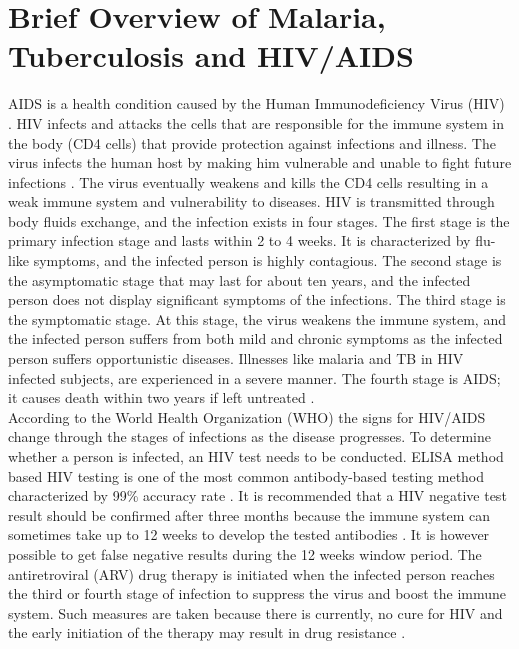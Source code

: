 


\section{Brief Overview of Malaria, Tuberculosis and HIV/AIDS}
AIDS is a health condition caused by the Human Immunodeficiency Virus (HIV) \cite{mbulaiteye_hiv_2011,dalessandro_comparison_1995}. HIV infects and attacks the cells that are responsible for the immune system in the body (CD4 cells) that provide protection against infections and illness. The virus infects the human host by making him vulnerable and unable to fight future infections \cite{joint_united_nations_programme_on_hiv/aids_aids_2007}. The virus eventually weakens and kills the CD4 cells resulting in a weak immune system and vulnerability to diseases. HIV is transmitted through body fluids exchange, and the infection exists in four stages. The first stage is the primary infection stage and lasts within 2 to 4 weeks. It is characterized by flu-like symptoms, and the infected person is highly contagious. The second stage is the asymptomatic stage that may last for about ten years, and the infected person does not display significant symptoms of the infections. The third stage is the symptomatic stage. At this stage, the virus weakens the immune system, and the infected person suffers from both mild and chronic symptoms as the infected person suffers opportunistic diseases. Illnesses like malaria and TB in HIV infected subjects, are experienced in a severe manner. The fourth stage is AIDS; it causes death within two years if left untreated \cite{joint_united_nations_programme_on_hiv/aids_aids_2007,whiteside_hiv/aids:_2008}.\\
According to the World Health Organization (WHO) the signs for HIV/AIDS change through the stages of infections as the disease progresses. To determine whether a person is infected, an HIV test needs to be conducted. ELISA method based HIV testing is one of the most common antibody-based testing method characterized by 99\% accuracy rate \cite{mbulaiteye_hiv_2011}. It is recommended that a HIV negative test result should be confirmed after three months because the immune system can sometimes take up to 12 weeks to develop the tested antibodies \cite{centers_for_disease_control_and_prevention_revised_2007}. It is however possible to get false negative results during the 12 weeks window period. The antiretroviral (ARV) drug therapy is initiated when the infected person reaches the third or fourth stage of infection to suppress the virus and boost the immune system. Such measures are taken because there is currently, no cure for HIV and the early initiation of the therapy may result in drug resistance \cite{brenner_we_2016,calmy_hiv_2004,clavel_hiv_2004}.\\
